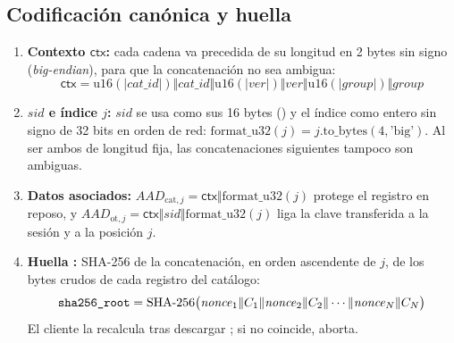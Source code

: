 \subsection{Codificaci\'on can\'onica y huella}
\begin{enumerate}
\item \textbf{Contexto $\mathsf{ctx}$:} cada cadena va precedida de su
longitud en 2 bytes sin signo (\emph{big-endian}), para que la
concatenaci\'on no sea ambigua:
\begin{equation}
\mathsf{ctx} = \mathrm{u16}(|\mathit{cat\_id}|)\Vert \mathit{cat\_id} \Vert
\mathrm{u16}(|\mathit{ver}|)\Vert \mathit{ver} \Vert
\mathrm{u16}(|\mathit{group}|)\Vert \mathit{group}
\end{equation}
\item \textbf{$sid$ e \'indice $j$:} $sid$ se usa como sus 16 bytes
() y el \'indice como entero sin signo de 32 bits
en orden de red: $\mathrm{format\_u32}(j) = j.\mathrm{to\_bytes}(4, \text{'big'})$.
Al ser ambos de longitud fija, las concatenaciones siguientes tampoco son
ambiguas.
\item \textbf{Datos asociados:}
$AAD_{\mathrm{cat}, j} = \mathsf{ctx} \Vert \mathrm{format\_u32}(j)$ protege
el registro en reposo, y
$AAD_{\mathrm{ot}, j} = \mathsf{ctx} \Vert sid \Vert \mathrm{format\_u32}(j)$
liga la clave transferida a la sesi\'on y a la posici\'on $j$.
\item \textbf{Huella :} SHA-256 de la concatenaci\'on, en
orden ascendente de $j$, de los bytes crudos de cada registro del cat\'alogo:
\begin{equation}
\texttt{sha256\_root} = \mathrm{SHA\text{-}256}\big(\mathit{nonce}_1 \Vert C_1
\Vert \mathit{nonce}_2 \Vert C_2 \Vert \cdots \Vert \mathit{nonce}_N \Vert C_N\big)
\end{equation}
El cliente la recalcula tras descargar ; si no coincide,
aborta.
\end{enumerate}

